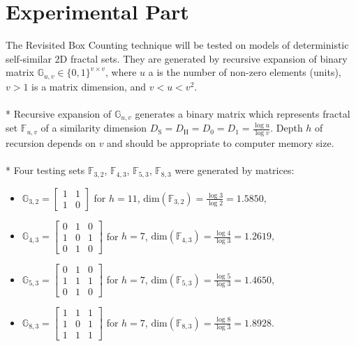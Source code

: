 \section {Experimental Part }

The Revisited Box Counting technique will be tested on models of deterministic self-similar 2D fractal sets. They are generated by recursive expansion of binary matrix $\mathbb{G}_{u,v} \in \{ 0, 1 \}^{v \times v} $, where $u$ a is the number of non-zero elements (units), $v>1$ is a matrix dimension, and $v<u<v^2$. \\
\\*
Recursive expansion of $\mathbb{G}_{u,v}$ generates a binary matrix which represents fractal set $\mathbb{F}_{u,v}$ of a similarity dimension $D_{\text{S}} = D_{\text{H}} = D_{0} = D_{1} = \frac{\log{u}}{\log{v}}$. Depth $h$ of recursion depends on $v$ and should be appropriate to computer memory size.\\
\\*
Four testing sets $\mathbb{F}_{3,2}$, $\mathbb{F}_{4,3}$, $\mathbb{F}_{5,3}$, $\mathbb{F}_{8,3}$ were generated by matrices:
\begin{itemize}
\item 

$\mathbb{G}_{3,2} = \begin{bmatrix}
1 & 1 \\
1 & 0 
\end{bmatrix}$ for $h=11$, $\text{dim}(\mathbb{F}_{3,2}) = \frac{\log{3}}{\log{2}} = 1.5850,$

\item 

$\mathbb{G}_{4,3} = \begin{bmatrix}
0 & 1 & 0 \\
1 & 0 & 1 \\
0 & 1 & 0
\end{bmatrix}$ for $h=7$, $\text{dim}(\mathbb{F}_{4,3}) = \frac{\log{4}}{\log{3}} = 1.2619,$

\item 

$\mathbb{G}_{5,3} = \begin{bmatrix}
0 & 1 & 0 \\
1 & 1 & 1 \\
0 & 1 & 0
\end{bmatrix}$ for $h=7$, $\text{dim}(\mathbb{F}_{5,3}) = \frac{\log{5}}{\log{3}} = 1.4650,$

\item 

$\mathbb{G}_{8,3} = \begin{bmatrix}
1 & 1 & 1 \\
1 & 0 & 1 \\
1 & 1 & 1
\end{bmatrix}$ for $h=7$, $\text{dim}(\mathbb{F}_{8,3}) = \frac{\log{8}}{\log{3}} = 1.8928.$
\end{itemize}
